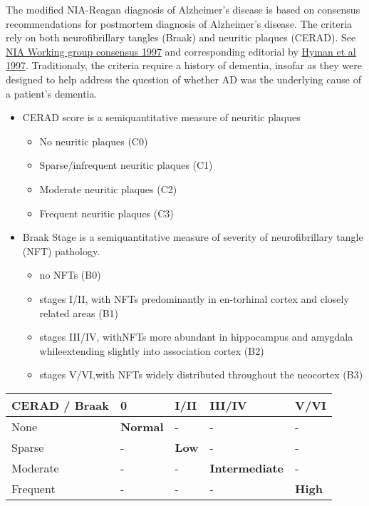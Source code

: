 \documentclass[]{book}
\providecommand{\tightlist}{%
  \setlength{\itemsep}{0pt}\setlength{\parskip}{0pt}}
\begin{document}
The modified NIA-Reagan diagnosis of Alzheimer's disease is based on consensus recommendations for postmortem diagnosis of Alzheimer's disease. The criteria rely on both neurofibrillary tangles (Braak) and neuritic plaques (CERAD). See \href{https://doi.org/10.1016/S0197-4580(97)00057-2}{NIA Working group consensus 1997} and corresponding editorial by \href{https://doi.org/10.1097/00005072-199710000-00002}{Hyman et al 1997}. Traditionaly, the criteria require a history of dementia, insofar as they were designed to help address the question of whether AD was the underlying cause of a patient's dementia.

\begin{itemize}
\tightlist
\item
  CERAD score is a semiquantitative measure of neuritic plaques

  \begin{itemize}
  \tightlist
  \item
    No neuritic plaques (C0)
  \item
    Sparse/infrequent neuritic plaques (C1)
  \item
    Moderate neuritic plaques (C2)
  \item
    Frequent neuritic plaques (C3)
  \end{itemize}
\item
  Braak Stage is a semiquantitative measure of severity of neurofibrillary tangle (NFT) pathology.

  \begin{itemize}
  \tightlist
  \item
    no NFTs (B0)
  \item
    stages I/II, with NFTs predominantly in en-torhinal cortex and closely related areas (B1)
  \item
    stages III/IV, withNFTs more abundant in hippocampus and amygdala whileextending slightly into association cortex (B2)
  \item
    stages V/VI,with NFTs widely distributed throughout the neocortex (B3)
  \end{itemize}
\end{itemize}

\begin{longtable}[]{@{}lllll@{}}
\toprule
CERAD / Braak & 0 & I/II & III/IV & V/VI\tabularnewline
\midrule
\endhead
None & \textbf{Normal} & - & - & -\tabularnewline
Sparse & - & \textbf{Low} & - & -\tabularnewline
Moderate & - & - & \textbf{Intermediate} & -\tabularnewline
Frequent & - & - & - & \textbf{High}\tabularnewline
\bottomrule
\end{longtable}
\end{document}
